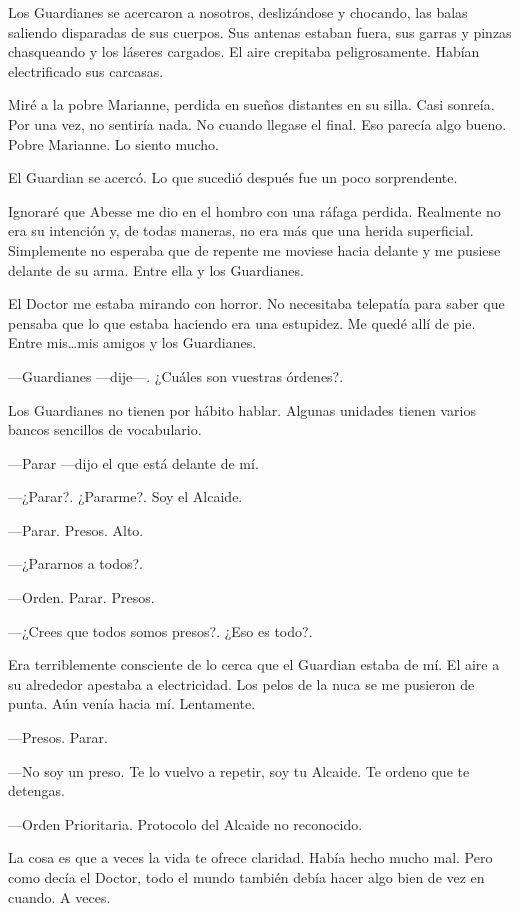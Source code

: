 Los Guardianes se acercaron a nosotros, deslizándose y chocando, las
balas saliendo disparadas de sus cuerpos. Sus antenas estaban fuera, sus
garras y pinzas chasqueando y los láseres cargados. El aire crepitaba
peligrosamente. Habían electrificado sus carcasas.

Miré a la pobre Marianne, perdida en sueños distantes en su silla. Casi
sonreía. Por una vez, no sentiría nada. No cuando llegase el final. Eso
parecía algo bueno. Pobre Marianne. Lo siento mucho.

El Guardian se acercó. Lo que sucedió después fue un poco sorprendente.

Ignoraré que Abesse me dio en el hombro con una ráfaga perdida.
Realmente no era su intención y, de todas maneras, no era más que una
herida superficial. Simplemente no esperaba que de repente me moviese
hacia delante y me pusiese delante de su arma. Entre ella y los
Guardianes.

El Doctor me estaba mirando con horror. No necesitaba telepatía para
saber que pensaba que lo que estaba haciendo era una estupidez. Me quedé
allí de pie. Entre mis\ldots{}mis amigos y los Guardianes.

---Guardianes ---dije---. ¿Cuáles son vuestras órdenes?.

Los Guardianes no tienen por hábito hablar. Algunas unidades tienen
varios bancos sencillos de vocabulario.

---Parar ---dijo el que está delante de mí.

---¿Parar?. ¿Pararme?. Soy el Alcaide.

---Parar. Presos. Alto.

---¿Pararnos a todos?.

---Orden. Parar. Presos.

---¿Crees que todos somos presos?. ¿Eso es todo?.

Era terriblemente consciente de lo cerca que el Guardian estaba de mí.
El aire a su alrededor apestaba a electricidad. Los pelos de la nuca se
me pusieron de punta. Aún venía hacia mí. Lentamente.

---Presos. Parar.

---No soy un preso. Te lo vuelvo a repetir, soy tu Alcaide. Te ordeno
que te detengas.

---Orden Prioritaria. Protocolo del Alcaide no reconocido.

La cosa es que a veces la vida te ofrece claridad. Había hecho mucho
mal. Pero como decía el Doctor, todo el mundo también debía hacer algo
bien de vez en cuando. A veces.

